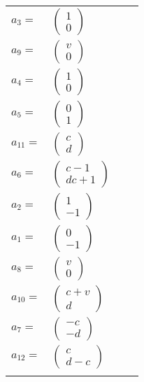 \documentclass[1p]{elsarticle_modified}
\theoremstyle{definition}
\begin{document}
\begin{tabular}{m{7pt} m{180pt} m{7pt} m{180pt} }
\flushright $a_{3}=$&$\begin{pmatrix}1\\0\end{pmatrix}$ \\
\flushright $a_{9}=$&$\begin{pmatrix}v\\0\end{pmatrix}$ \\
\flushright $a_{4}=$&$\begin{pmatrix}1\\0\end{pmatrix}$ \\
\flushright $a_{5}=$&$\begin{pmatrix}0\\1\end{pmatrix}$ \\
\flushright $a_{11}=$&$\begin{pmatrix}c\\d\end{pmatrix}$ \\
\flushright $a_{6}=$&$\begin{pmatrix}c-1\\d c+1\end{pmatrix}$ \\
\flushright $a_{2}=$&$\begin{pmatrix}1\\-1\end{pmatrix}$ \\
\flushright $a_{1}=$&$\begin{pmatrix}0\\-1\end{pmatrix}$ \\
\flushright $a_{8}=$&$\begin{pmatrix}v\\0\end{pmatrix}$ \\
\flushright $a_{10}=$&$\begin{pmatrix}c+v\\d\end{pmatrix}$ \\
\flushright $a_{7}=$&$\begin{pmatrix}- c\\- d\end{pmatrix}$ \\
\flushright $a_{12}=$&$\begin{pmatrix}c\\d- c\end{pmatrix}$\\&\end{tabular}
\end{document}

